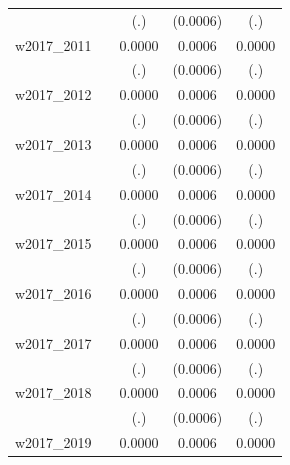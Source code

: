 \begin{table}[htbp]
\begin{tabular}{l*{4}{c}}
            &                     &         (.)         &    (0.0006)         &         (.)         \\
[1em]
w2017\_2011  &                     &      0.0000         &      0.0006         &      0.0000         \\
            &                     &         (.)         &    (0.0006)         &         (.)         \\
[1em]
w2017\_2012  &                     &      0.0000         &      0.0006         &      0.0000         \\
            &                     &         (.)         &    (0.0006)         &         (.)         \\
[1em]
w2017\_2013  &                     &      0.0000         &      0.0006         &      0.0000         \\
            &                     &         (.)         &    (0.0006)         &         (.)         \\
[1em]
w2017\_2014  &                     &      0.0000         &      0.0006         &      0.0000         \\
            &                     &         (.)         &    (0.0006)         &         (.)         \\
[1em]
w2017\_2015  &                     &      0.0000         &      0.0006         &      0.0000         \\
            &                     &         (.)         &    (0.0006)         &         (.)         \\
[1em]
w2017\_2016  &                     &      0.0000         &      0.0006         &      0.0000         \\
            &                     &         (.)         &    (0.0006)         &         (.)         \\
[1em]
w2017\_2017  &                     &      0.0000         &      0.0006         &      0.0000         \\
            &                     &         (.)         &    (0.0006)         &         (.)         \\
[1em]
w2017\_2018  &                     &      0.0000         &      0.0006         &      0.0000         \\
            &                     &         (.)         &    (0.0006)         &         (.)         \\
[1em]
w2017\_2019  &                     &      0.0000         &      0.0006         &      0.0000         \\

\end{tabular}
\end{table}

